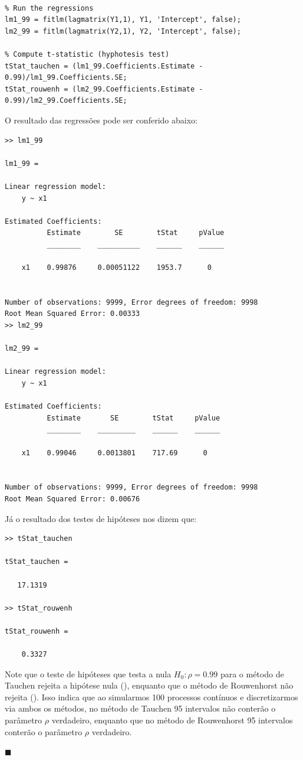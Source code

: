 \documentclass[10pt]{article}
\newcommand*{\QEDA}{\hfill\ensuremath{\blacksquare}}%
\newcommand\0{\mathbf{0}}
\newenvironment{sol}
    {\\[1em] {\color{magenta}\text{Resposta.}}
    }
    {{\color{blue!50!black}\QEDA}}
\begin{document}
\begin{enumerate}[label = 5.\arabic*., wide]
\begin{sol}
\begin{lstlisting}
% Run the regressions
lm1_99 = fitlm(lagmatrix(Y1,1), Y1, 'Intercept', false);
lm2_99 = fitlm(lagmatrix(Y2,1), Y2, 'Intercept', false);

% Compute t-statistic (hyphotesis test)
tStat_tauchen = (lm1_99.Coefficients.Estimate - 0.99)/lm1_99.Coefficients.SE;
tStat_rouwenh = (lm2_99.Coefficients.Estimate - 0.99)/lm2_99.Coefficients.SE;
\end{lstlisting}
\newpage
O resultado das regressões pode ser conferido abaixo: \vspace{-0.4cm}
\begin{lstlisting}
>> lm1_99

lm1_99 = 

Linear regression model:
    y ~ x1

Estimated Coefficients:
          Estimate        SE        tStat     pValue
          ________    __________    ______    ______

    x1    0.99876     0.00051122    1953.7      0   


Number of observations: 9999, Error degrees of freedom: 9998
Root Mean Squared Error: 0.00333
>> lm2_99

lm2_99 = 

Linear regression model:
    y ~ x1

Estimated Coefficients:
          Estimate       SE        tStat     pValue
          ________    _________    ______    ______

    x1    0.99046     0.0013801    717.69      0   


Number of observations: 9999, Error degrees of freedom: 9998
Root Mean Squared Error: 0.00676
\end{lstlisting}
Já o resultado dos testes de hipóteses nos dizem que: \vspace{-0.4cm}
\begin{lstlisting}
>> tStat_tauchen

tStat_tauchen =

   17.1319

>> tStat_rouwenh

tStat_rouwenh =

    0.3327
\end{lstlisting}
Note que o teste de hipóteses que testa a nula $H_0: \rho = 0.99$ para o método de Tauchen rejeita a hipótese nula (), enquanto que o método de Rouwenhorst não rejeita (). Isso indica que ao simularmos 100 processos contínuos e discretizarmos via ambos os métodos, no método de Tauchen 95 intervalos não conterão o parâmetro $\rho$ verdadeiro, enquanto que no método de Rouwenhorst 95 intervalos conterão o parâmetro $\rho$ verdadeiro.


\end{sol}
\end{enumerate}
\end{document}
